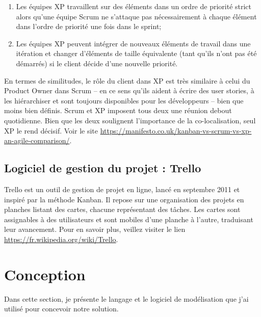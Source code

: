 \begin{enumerate}
	\item Les équipes XP travaillent sur des éléments dans un ordre de priorité strict alors qu’une équipe Scrum ne s’attaque pas nécessairement à chaque élément dans l’ordre de priorité une fois dans le sprint;
	\item Les équipes XP peuvent intégrer de nouveaux éléments de travail dans une itération et changer d’éléments de taille équivalente (tant qu’ils n’ont pas été démarrés) si le client décide d’une nouvelle priorité.
	
\end{enumerate}
En termes de similitudes, le rôle du client dans XP est très similaire à celui du Product Owner dans Scrum – en ce sens qu’ils aident à écrire des user stories, à les hiérarchiser et sont toujours disponibles pour les développeurs – bien que moins bien définis. \newline
Scrum et XP imposent tous deux une réunion debout quotidienne. Bien que les deux soulignent l’importance de la co-localisation, seul XP le rend décisif. Voir le site \href{https://manifesto.co.uk/kanban-vs-scrum-vs-xp-an-agile-comparison/}{https://manifesto.co.uk/kanban-vs-scrum-vs-xp-an-agile-comparison/}.


\subsection{Logiciel de gestion du projet : Trello}
Trello est un outil de gestion de projet en ligne, lancé en septembre 2011 et inspiré par la méthode Kanban. Il repose sur une organisation des projets en planches listant des cartes, chacune représentant des tâches. Les cartes sont assignables à des utilisateurs et sont mobiles d'une planche à l'autre, traduisant leur avancement. Pour en savoir plus, veillez visiter le lien \href{https://fr.wikipedia.org/wiki/Trello}{https://fr.wikipedia.org/wiki/Trello}.

\section{Conception}
Dans cette section, je présente le langage et le logiciel de modélisation que j'ai utilisé pour concevoir notre solution.


